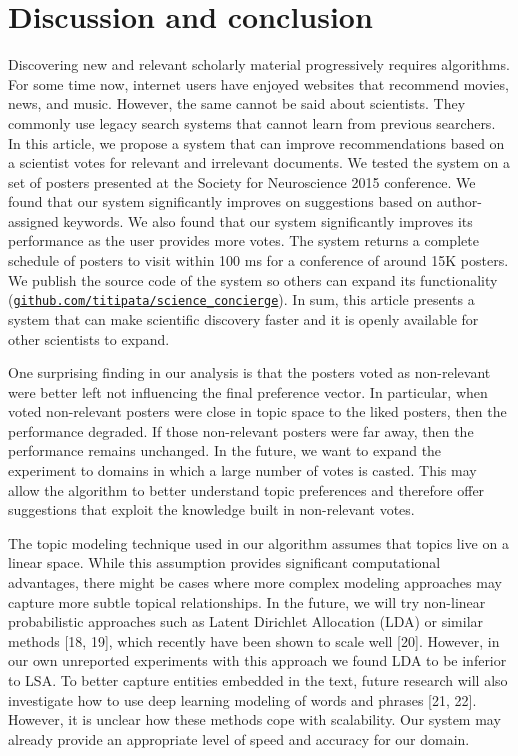 \documentclass[a4paper]{article}
\begin{document}
\section{Discussion and conclusion}

Discovering new and relevant scholarly material progressively requires algorithms. For some time now, internet users have enjoyed websites that recommend movies, news, and music. However, the same cannot be said about scientists. They commonly use legacy search systems that cannot learn from previous searchers. In this article, we propose a system that can improve recommendations based on a scientist votes for relevant and irrelevant documents. We tested the system on a set of posters presented at the Society for Neuroscience 2015 conference. We found that our system significantly improves on suggestions based on author-assigned keywords. We also found that our system significantly improves its performance as the user provides more votes. The system returns a complete schedule of posters to visit within 100 ms for a conference of around 15K posters. We publish the source code of the system so others can expand its functionality (\href{https://github.com/titipata/science_concierge}{\texttt{github.com/titipata/science\_concierge}}). In sum, this article presents a system that can make scientific discovery faster and it is openly available for other scientists to expand.


One surprising finding in our analysis is that the posters voted as non-relevant were better left not influencing the final preference vector. In particular, when voted non-relevant posters were close in topic space to the liked posters, then the performance degraded. If those non-relevant posters were far away, then the performance remains unchanged. In the future, we want to expand the experiment to domains in which a large number of votes is casted. This may allow the algorithm to better understand topic preferences and therefore offer suggestions that exploit the knowledge built in non-relevant votes.


The topic modeling technique used in our algorithm assumes that topics live on a linear space. While this assumption provides significant computational advantages, there might be cases where more complex modeling approaches may capture more subtle topical relationships. In the future, we will try non-linear probabilistic approaches such as Latent Dirichlet Allocation (LDA) or similar methods [18, 19], which recently have been shown to scale well [20]. However, in our own unreported experiments with this approach we found LDA to be inferior to LSA. To better capture entities embedded in the text, future research will also investigate how to use deep learning modeling of words and phrases [21, 22]. However, it is unclear how these methods cope with scalability. Our system may already provide an appropriate level of speed and accuracy for our domain.
\end{document}

